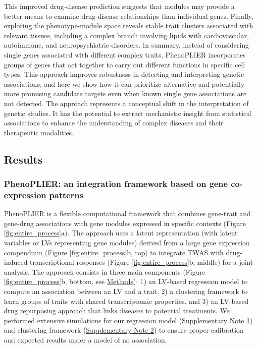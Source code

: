 \documentclass[
  a4paper,
]{article}
\begin{document}
This improved drug-disease prediction suggests that modules may provide a better means to examine drug-disease relationships than individual genes.
Finally, exploring the phenotype-module space reveals stable trait clusters associated with relevant tissues, including a complex branch involving lipids with cardiovascular, autoimmune, and neuropsychiatric disorders.
In summary, instead of considering single genes associated with different complex traits, PhenoPLIER incorporates groups of genes that act together to carry out different functions in specific cell types.
This approach improves robustness in detecting and interpreting genetic associations, and here we show how it can prioritize alternative and potentially more promising candidate targets even when known single gene associations are not detected.
The approach represents a conceptual shift in the interpretation of genetic studies.
It has the potential to extract mechanistic insight from statistical associations to enhance the understanding of complex diseases and their therapeutic modalities.

\hypertarget{results}{%
\subsection{Results}\label{results}}

\hypertarget{phenoplier-an-integration-framework-based-on-gene-co-expression-patterns}{%
\subsubsection{PhenoPLIER: an integration framework based on gene co-expression patterns}\label{phenoplier-an-integration-framework-based-on-gene-co-expression-patterns}}

PhenoPLIER is a flexible computational framework that combines gene-trait and gene-drug associations with gene modules expressed in specific contexts (Figure \ref{fig:entire_process}a).
The approach uses a latent representation (with latent variables or LVs representing gene modules) derived from a large gene expression compendium (Figure \ref{fig:entire_process}b, top) to integrate TWAS with drug-induced transcriptional responses (Figure \ref{fig:entire_process}b, middle) for a joint analysis.
The approach consists in three main components (Figure \ref{fig:entire_process}b, bottom, see \protect\hyperlink{sec:methods}{Methods}):
1) an LV-based regression model to compute an association between an LV and a trait,
2) a clustering framework to learn groups of traits with shared transcriptomic properties,
and 3) an LV-based drug repurposing approach that links diseases to potential treatments.
We performed extensive simulations for our regression model (\protect\hyperlink{sm:reg:null_sim}{Supplementary Note 1}) and clustering framework (\protect\hyperlink{sm:clustering:null_sim}{Supplementary Note 2}) to ensure proper calibration and expected results under a model of no association.
\end{document}
